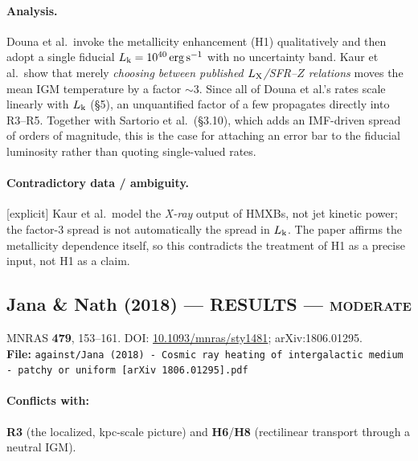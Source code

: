 \documentclass[11pt,a4paper]{article}
\newcommand{\RES}{\textcolor{red!60!black}{\textbf{RESULTS}}}
\newcommand{\flag}[1]{\textcolor{orange!75!black}{\textsf{\small [#1]}}}
\begin{document}
\paragraph{Analysis.}
Douna et al.\ invoke the metallicity enhancement (H1) qualitatively and then
adopt a single fiducial $L_{\rm k}=10^{40}\,{\rm erg\,s^{-1}}$ with no
uncertainty band. Kaur et al.\ show that merely \emph{choosing between published
$L_{\rm X}$/SFR--$Z$ relations} moves the mean IGM temperature by a factor
$\sim3$. Since all of Douna et al.'s rates scale linearly with $L_{\rm k}$
(\S5), an unquantified factor of a few propagates directly into R3--R5. Together
with Sartorio et al.\ (\S3.10), which adds an IMF-driven spread of orders of
magnitude, this is the case for attaching an error bar to the fiducial
luminosity rather than quoting single-valued rates.

\paragraph{Contradictory data / ambiguity.} \flag{explicit}
Kaur et al.\ model the \emph{X-ray} output of HMXBs, not jet kinetic power; the
factor-3 spread is not automatically the spread in $L_{\rm k}$. The paper
affirms the metallicity dependence itself, so this contradicts the treatment of
H1 as a precise input, not H1 as a claim.

\subsection{Jana \& Nath (2018) --- \RES{} --- \textsc{moderate}}
\noindent MNRAS \textbf{479}, 153--161. DOI:
\href{https://doi.org/10.1093/mnras/sty1481}{10.1093/mnras/sty1481};
arXiv:1806.01295.\\
\textbf{File:} \texttt{against/Jana (2018) - Cosmic ray heating of intergalactic medium - patchy or uniform [arXiv 1806.01295].pdf}

\paragraph{Conflicts with:} \textbf{R3} (the localized, kpc-scale picture) and
\textbf{H6}/\textbf{H8} (rectilinear transport through a neutral IGM).
\end{document}
